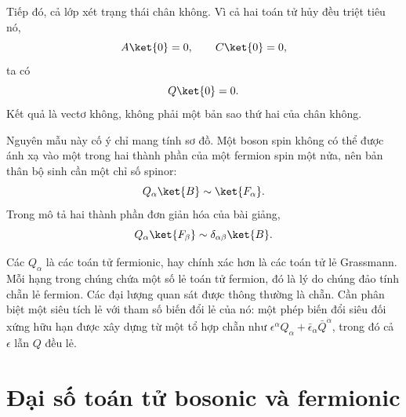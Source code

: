 Tiếp đó, cả lớp xét trạng thái chân không. Vì cả hai toán tử hủy đều triệt tiêu nó,
\begin{equation}
A\ket{0}=0,\qquad C\ket{0}=0,
\end{equation}
ta có
\begin{equation}
Q\ket{0}=0.
\end{equation}
Kết quả là vectơ không, không phải một bản sao thứ hai của chân không.

Nguyên mẫu này cố ý chỉ mang tính sơ đồ. Một boson spin không có thể được ánh xạ vào một trong hai thành phần của một fermion spin một nửa, nên bản thân bộ sinh cần một chỉ số spinor:
\begin{equation}
Q_\alpha\ket{B}\sim\ket{F_\alpha}.
\end{equation}
Trong mô tả hai thành phần đơn giản hóa của bài giảng,
\begin{equation}
Q_\alpha\ket{F_\beta}\sim\delta_{\alpha\beta}\ket{B}.
\end{equation}

\begin{classroomqa}
\end{classroomqa}

Các \(Q_\alpha\) là các toán tử fermionic, hay chính xác hơn là các toán tử lẻ Grassmann. Mỗi hạng trong chúng chứa một số lẻ toán tử fermion, đó là lý do chúng đảo tính chẵn lẻ fermion. Các đại lượng quan sát được thông thường là chẵn. Cần phân biệt một siêu tích lẻ với tham số biến đổi lẻ của nó: một phép biến đổi siêu đối xứng hữu hạn được xây dựng từ một tổ hợp chẵn như \(\epsilon^\alpha Q_\alpha+\bar\epsilon_{\dot\alpha}\bar Q^{\dot\alpha}\), trong đó cả \(\epsilon\) lẫn \(Q\) đều lẻ. 

\section{Đại số toán tử bosonic và fermionic}

